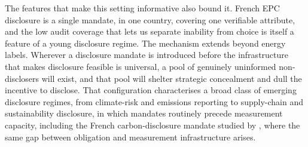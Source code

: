 The features that make this setting informative also bound it. French EPC disclosure is a
single mandate, in one country, covering one verifiable attribute, and the low audit coverage
that lets us separate inability from choice is itself a feature of a young disclosure regime.
The mechanism extends beyond energy labels. Wherever a disclosure mandate is
introduced before the infrastructure that makes disclosure feasible is universal, a pool of
genuinely uninformed non-disclosers will exist, and that pool will shelter strategic
concealment and dull the incentive to disclose. That configuration characterises a broad class
of emerging disclosure regimes, from climate-risk and emissions reporting to supply-chain and
sustainability disclosure, in which mandates routinely precede measurement capacity, including
the French carbon-disclosure mandate studied by \citet{bourveau_carbon_2024}, where the same
gap between obligation and measurement infrastructure arises.
